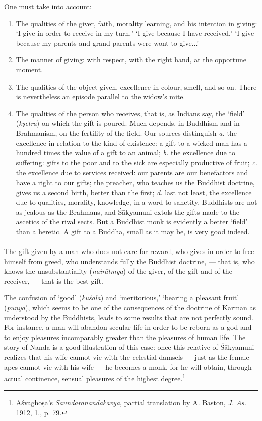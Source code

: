 \documentclass[a4paper, 11pt, oneside, english, landscape]{article}
\begin{document}
One must take into account:
\begin{enumerate}
    \item The qualities of the giver, faith, morality learning, and his intention in giving: `I give in order to receive in my turn,' `I give because I have received,' `I give because my parents and grand-parents were wont to give...'

    \item The manner of giving: with respect, with the right hand, at the opportune moment.

    \item The qualities of the object given, excellence in colour, smell, and so on. There is nevertheless an episode parallel to the widow's mite.

    \item The qualities of the person who receives, that is, as Indians say, the `field' (\emph{kṣetra}) on which the gift is poured. Much depends, in Buddhism and in Brahmanism, on the fertility of the field. Our sources distinguish \emph{a.} the excellence in relation to the kind of existence: a gift to a wicked man has a hundred times the value of a gift to an animal; \emph{b.} the excellence due to suffering: gifts to the poor and to the sick are especially productive of fruit; \emph{c.} the excellence due to services received: our parents are our benefactors and have a right to our gifts; the preacher, who teaches us the Buddhist doctrine, gives us a second birth, better than the first; \emph{d.} last not least, the excellence due to qualities, morality, knowledge, in a word to sanctity. Buddhists are not as jealous as the Brahmans, and Śākyamuni extols the gifts made to the ascetics of the rival sects. But a Buddhist monk is evidently a better `field' than a heretic. A gift to a Buddha, small as it may be, is very good indeed.
\end{enumerate}
\paragraph{}
The gift given by a man who does not care for reward, who gives in order to free himself from greed, who understands fully the Buddhist doctrine, --- that is, who knows the unsubstantiality (\emph{nairātmya}) of the giver, of the gift and of the receiver, --- that is the best gift.

The confusion of `good' (\emph{kuśala}) and `meritorious,' `bearing a pleasant fruit' (\emph{puṇya}), which seems to be one of the consequences of the doctrine of Karman as understood by the Buddhists, leads to some results that are not perfectly sound. For instance, a man will abandon secular life in order to be reborn as a god and to enjoy pleasures incomparably greater than the pleasures of human life. The story of Nanda is a good illustration of this case: once this relative of Śākyamuni realizes that his wife cannot vie with the celestial damsels --- just as the female apes cannot vie with his wife --- he becomes a monk, for he will obtain, through actual continence, sensual pleasures of the highest degree.\footnote{Aśvaghoṣa's \emph{Saundaranandakāvya}, partial translation by A. Baston, \emph{J. As.} 1912, 1., p. 79.}
\end{document}
